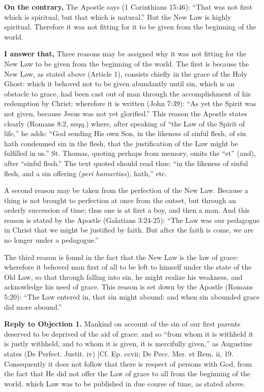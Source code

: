 \textbf{On the contrary,} The Apostle says (1 Corinthians 15:46): ``That was not first which is spiritual, but that which is natural.'' But the New Law is highly spiritual. Therefore it was not fitting for it to be given from the beginning of the world.

\textbf{I answer that,} Three reasons may be assigned why it was not fitting for the New Law to be given from the beginning of the world. The first is because the New Law, as stated above (Article 1), consists chiefly in the grace of the Holy Ghost: which it behoved not to be given abundantly until sin, which is an obstacle to grace, had been cast out of man through the accomplishment of his redemption by Christ: wherefore it is written (John 7:39): ``As yet the Spirit was not given, because Jesus was not yet glorified.'' This reason the Apostle states clearly (Romans 8:2, seqq.) where, after speaking of ``the Law of the Spirit of life,'' he adds: ``God sending His own Son, in the likeness of sinful flesh, of sin hath condemned sin in the flesh, that the justification of the Law might be fulfilled in us.'' St. Thomas, quoting perhaps from memory, omits the ``et'' (and), after ``sinful flesh.'' The text quoted should read thus: ``in the likeness of sinful flesh, and a sin offering (\emph{peri hamartias}), hath,'' etc.

A second reason may be taken from the perfection of the New Law. Because a thing is not brought to perfection at once from the outset, but through an orderly succession of time; thus one is at first a boy, and then a man. And this reason is stated by the Apostle (Galatians 3:24-25): ``The Law was our pedagogue in Christ that we might be justified by faith. But after the faith is come, we are no longer under a pedagogue.''

The third reason is found in the fact that the New Law is the law of grace: wherefore it behoved man first of all to be left to himself under the state of the Old Law, so that through falling into sin, he might realize his weakness, and acknowledge his need of grace. This reason is set down by the Apostle (Romans 5:20): ``The Law entered in, that sin might abound: and when sin abounded grace did more abound.''

\textbf{Reply to Objection 1.} Mankind on account of the sin of our first parents deserved to be deprived of the aid of grace: and so ``from whom it is withheld it is justly withheld, and to whom it is given, it is mercifully given,'' as Augustine states (De Perfect. Justit. iv) [Cf. Ep. ccvii; De Pecc. Mer. et Rem. ii, 19. Consequently it does not follow that there is respect of persons with God, from the fact that He did not offer the Law of grace to all from the beginning of the world, which Law was to be published in due course of time, as stated above.


